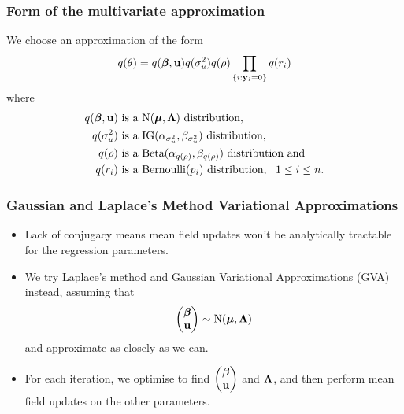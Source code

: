 \documentclass{beamer}
\begin{document}
\begin{frame}
	\frametitle{Form of the multivariate approximation}
	We choose an approximation of the form
	$$
	q(\theta) = q({\boldsymbol \beta}, {\bf u}) q(\sigma_u^2) q(\rho) \prod_{ \{i : {\bf y}_i = 0\} } q(r_i)
	$$
	where
	\begin{align*}
		q({\boldsymbol \beta}, {\bf u}) & \text{ is a } \text{N}({\boldsymbol \mu}, {\boldsymbol \Lambda}) \text{ distribution},                                  \\
		q(\sigma_u^2)  & \text{ is a } \text{IG}(\alpha_{\sigma_u^2}, \beta_{\sigma_u^2}) \text{ distribution},        \\
		q(\rho)        & \text{ is a } \text{Beta}(\alpha_{q(\rho)}, \beta_{q(\rho)}) \text{ distribution} \text{ and} \\
		q(r_i)         & \text{ is a } \text{Bernoulli}(p_i) \text{ distribution}, \ \ 1 \leq i \leq n.                
	\end{align*}
\end{frame}

\begin{frame}
	\frametitle{Gaussian and Laplace's Method Variational Approximations}
	\begin{itemize}
		\item Lack of conjugacy means mean field updates won't be analytically tractable for the regression parameters.
		\item We try Laplace's method and Gaussian Variational Approximations (GVA) instead, assuming that
		      $$
		      \begin{pmatrix}
		      	{\boldsymbol\beta} \\
		      	{\bf u}    
		      \end{pmatrix}
		      \sim \text{N}({\boldsymbol \mu}, {\boldsymbol \Lambda})
		      $$
		      and approximate as closely as we can.
		\item For each iteration, we optimise to find
		      $\begin{pmatrix}
		      	{\boldsymbol\beta} \\
		      	{\bf u}    
		      \end{pmatrix}
		      $ and ${\boldsymbol \Lambda}$,
		      and then perform mean field updates on the other parameters.
	\end{itemize}
\end{frame}
\end{document}
